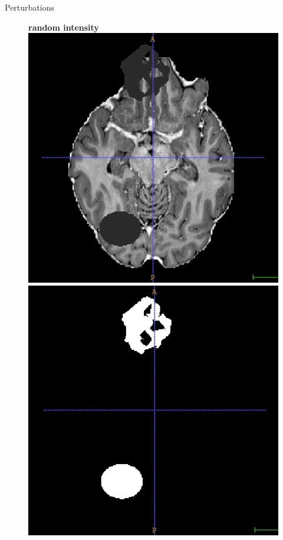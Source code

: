 \documentclass[10pt,aspectratio=169]{beamer}
\begin{document}
\begin{frame}{Perturbations}
	\begin{minipage}{.45\columnwidth}
		\begin{center}
			
			\begin{figure}
				\textbf{random intensity}\\[.2em]
				\includegraphics[width=.43\columnwidth]{_figs/int.png}\hfil
				\includegraphics[width=.43\columnwidth]{_figs/intm.png}
			\end{figure}\vspace{1em}
			

\end{center}
\end{minipage}
\end{frame}
\end{document}
